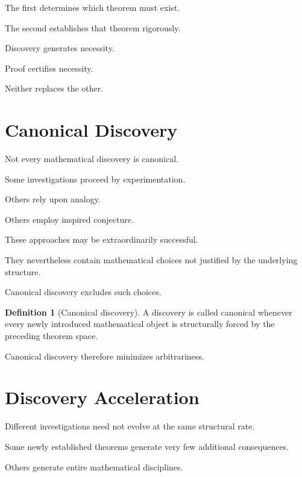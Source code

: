 \documentclass[13pt,openany]{book}
\theoremstyle{plain}
\theoremstyle{definition}
\newtheorem{definition}{Definition}[chapter]
\begin{document}
The first determines which theorem must exist.

The second establishes that theorem rigorously.

Discovery generates necessity.

Proof certifies necessity.

Neither replaces the other.

\section{Canonical Discovery}

Not every mathematical discovery is canonical.

Some investigations proceed by experimentation.

Others rely upon analogy.

Others employ inspired conjecture.

These approaches may be extraordinarily successful.

They nevertheless contain mathematical choices not justified by the underlying
structure.

Canonical discovery excludes such choices.

\begin{definition}[Canonical discovery]

A discovery is called canonical whenever every newly introduced mathematical
object is structurally forced by the preceding theorem space.

\end{definition}

Canonical discovery therefore minimizes arbitrariness.

\section{Discovery Acceleration}

Different investigations need not evolve at the same structural rate.

Some newly established theorems generate very few additional consequences.

Others generate entire mathematical disciplines.
\end{document}
